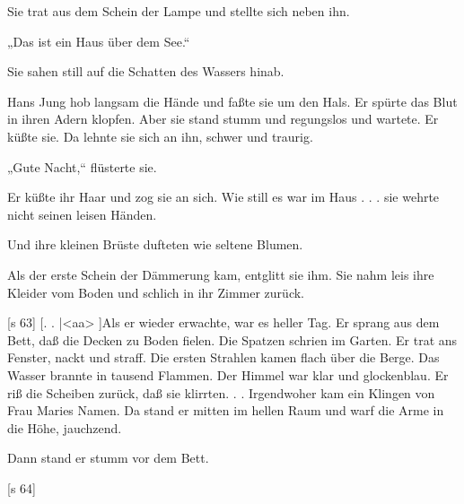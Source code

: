 Sie trat aus dem Schein der Lampe und stellte
sich neben ihn.

„Das ist ein Haus über dem See.“

Sie sahen still auf die Schatten des Wassers hinab.

Hans Jung hob langsam die Hände und faßte
sie um den Hals. Er spürte das Blut in ihren Adern
klopfen. Aber sie stand stumm und regungslos und
wartete. Er küßte sie. Da lehnte sie sich an ihn,
schwer und traurig.

„Gute Nacht,“ flüsterte sie.

Er küßte ihr Haar und zog sie an sich. Wie still es
war im Haus . . . sie wehrte nicht seinen leisen Händen.

Und ihre kleinen Brüste dufteten wie seltene
Blumen.

Als der erste Schein der Dämmerung kam,
entglitt sie ihm. Sie nahm leis ihre Kleider vom
Boden und schlich in ihr Zimmer zurück.

[s 63]
[. . |<aa>
]Als er wieder erwachte, war es heller Tag.
Er sprang aus dem Bett, daß die Decken zu Boden
fielen. Die Spatzen schrien im Garten. Er trat ans
Fenster, nackt und straff. Die ersten Strahlen kamen
flach über die Berge. Das Wasser brannte in tausend
Flammen. Der Himmel war klar und glockenblau.
Er riß die Scheiben zurück, daß sie klirrten. . .
Irgendwoher kam ein Klingen von Frau Maries
Namen. Da stand er mitten im hellen Raum und
warf die Arme in die Höhe, jauchzend.

Dann stand er stumm vor dem Bett.

[s 64]

